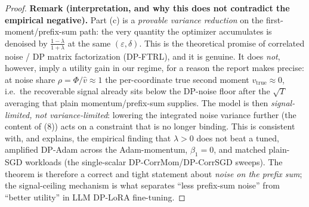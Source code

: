 \begin{proof}
\par\smallskip\noindent\textbf{Remark (interpretation, and why this does not contradict the empirical negative).}\quad 
Part (c) is a \emph{provable variance reduction} on the first-moment/prefix-sum path: the very quantity the optimizer accumulates is denoised by $\tfrac{1-\lambda}{1+\lambda}$ at the same $(\varepsilon,\delta)$. This is the theoretical promise of correlated noise / DP matrix factorization (DP-FTRL), and it is genuine. It does \emph{not}, however, imply a utility gain in our regime, for a reason the report makes precise: at noise share $\rho=\Phi/\hat v\approx1$ the per-coordinate true second moment $v_{\mathrm{true}}\approx0$, i.e.\ the recoverable signal already sits below the DP-noise floor after the $\sqrt T$ averaging that plain momentum/prefix-sum supplies. The model is then \emph{signal-limited, not variance-limited}: lowering the integrated noise variance further (the content of (8)) acts on a constraint that is no longer binding. This is consistent with, and explains, the empirical finding that $\lambda>0$ does not beat a tuned, amplified DP-Adam across the Adam-momentum, $\beta_1{=}0$, and matched plain-SGD workloads (the single-scalar DP-CorrMom/DP-CorrSGD sweeps). The theorem is therefore a correct and tight statement about \emph{noise on the prefix sum}; the signal-ceiling mechanism is what separates ``less prefix-sum noise'' from ``better utility'' in LLM DP-LoRA fine-tuning.
\end{proof}
